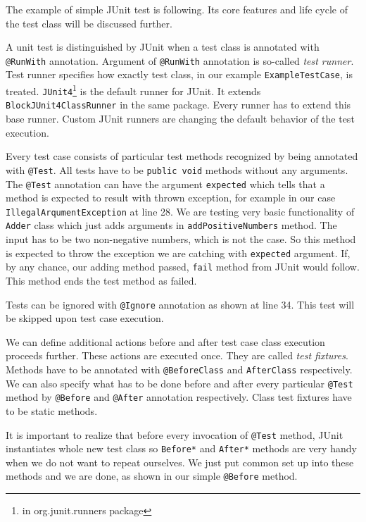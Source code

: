 \documentclass[12pt,final,oneside]{fithesis}
\begin{document}
The example of simple JUnit test is following. Its core features and life cycle of the test class will be discussed further.



\newpage

A unit test is distinguished by JUnit when a test class is annotated with \texttt{@RunWith} annotation. Argument of \texttt{@RunWith} annotation is so-called \textit{test runner}. Test runner specifies how exactly test class, in our example \texttt{ExampleTestCase}, is treated. \texttt{JUnit4}\footnote{in org.junit.runners package} is the default runner for JUnit. It extends \texttt{BlockJUnit4ClassRunner} in the same package. Every runner has to extend this base runner. Custom JUnit runners are changing the default behavior of the test execution.

Every test case consists of particular test methods recognized by being annotated with \texttt{@Test}. All tests have to be \texttt{public void} methods without any arguments. The \texttt{@Test} annotation can have the argument \texttt{expected} which tells that a method is expected to result with thrown exception, for example in our case \texttt{IllegalArqumentException} at line 28. We are testing very basic functionality of \texttt{Adder} class which just adds arguments in \texttt{addPositiveNumbers} method. The input has to be two non-negative numbers, which is not the case. So this method is expected to throw the exception we are catching with \texttt{expected} argument. If, by any chance, our adding method passed, \texttt{fail} method from JUnit would follow. This method ends the test method as failed.

Tests can be ignored with \texttt{@Ignore} annotation as shown at line 34. This test will be skipped upon test case execution.

We can define additional actions before and after test case class execution proceeds further. These actions are executed once. They are called \textit{test fixtures}. Methods have to be annotated with \texttt{@BeforeClass} and \texttt{AfterClass} respectively. We can also specify what has to be done before and after every particular \texttt{@Test} method by \texttt{@Before} and \texttt{@After} annotation respectively. Class test fixtures have to be static methods.

It is important to realize that before every invocation of \texttt{@Test} method, JUnit instantiates whole new test class so \texttt{Before*} and \texttt{After*} methods are very handy when we do not want to repeat ourselves. We just put common set up into these methods and we are done, as shown in our simple \texttt{@Before} method.
\end{document}
